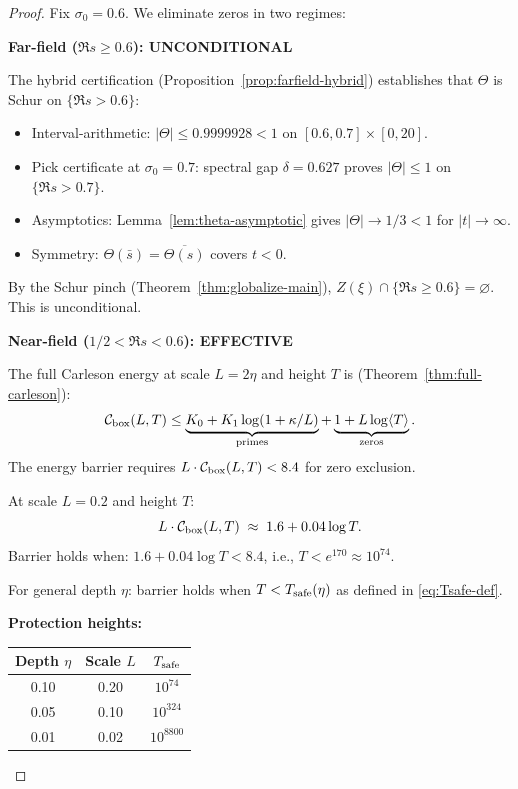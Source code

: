 \documentclass[11pt]{article}
\theoremstyle{definition}
\theoremstyle{remark}
\theoremstyle{definition}
\begin{document}
\begin{proof}
Fix $\sigma_0 = 0.6$. We eliminate zeros in two regimes:

\smallskip\noindent
\textbf{Far-field ($\Re s \ge 0.6$): UNCONDITIONAL}

The hybrid certification (Proposition~\ref{prop:farfield-hybrid}) establishes that $\Theta$ is Schur on $\{\Re s > 0.6\}$:
\begin{itemize}
\item Interval-arithmetic: $|\Theta| \le 0.9999928 < 1$ on $[0.6, 0.7] \times [0, 20]$.
\item Pick certificate at $\sigma_0 = 0.7$: spectral gap $\delta = 0.627$ proves $|\Theta| \le 1$ on $\{\Re s > 0.7\}$.
\item Asymptotics: Lemma~\ref{lem:theta-asymptotic} gives $|\Theta| \to 1/3 < 1$ for $|t| \to \infty$.
\item Symmetry: $\Theta(\bar{s}) = \overline{\Theta(s)}$ covers $t < 0$.
\end{itemize}
By the Schur pinch (Theorem~\ref{thm:globalize-main}), $Z(\xi) \cap \{\Re s \ge 0.6\} = \varnothing$. This is unconditional.

\smallskip\noindent
\textbf{Near-field ($1/2 < \Re s < 0.6$): EFFECTIVE}

The full Carleson energy at scale $L = 2\eta$ and height $T$ is (Theorem~\ref{thm:full-carleson}):
\[
  \mathcal{C}_{\rm box}(L, T) \le \underbrace{K_0 + K_1\log(1+\kappa/L)}_{\text{primes}} + \underbrace{1 + L\log\langle T\rangle}_{\text{zeros}}.
\]
The energy barrier requires $L \cdot \mathcal{C}_{\rm box}(L, T) < 8.4$ for zero exclusion.

At scale $L = 0.2$ and height $T$:
\[
  L \cdot \mathcal{C}_{\rm box}(L, T) \;\approx\; 1.6 + 0.04\log T.
\]
Barrier holds when: $1.6 + 0.04\log T < 8.4$, i.e., $T < e^{170} \approx 10^{74}$.

For general depth $\eta$: barrier holds when $T < T_{\rm safe}(\eta)$ as defined in \eqref{eq:Tsafe-def}.

\smallskip\noindent
\textbf{Protection heights:}
\begin{center}
\begin{tabular}{c|c|c}
Depth $\eta$ & Scale $L$ & $T_{\rm safe}$ \\
\hline
0.10 & 0.20 & $10^{74}$ \\
0.05 & 0.10 & $10^{324}$ \\
0.01 & 0.02 & $10^{8800}$ \\
\end{tabular}
\end{center}

\end{proof}
\end{document}
